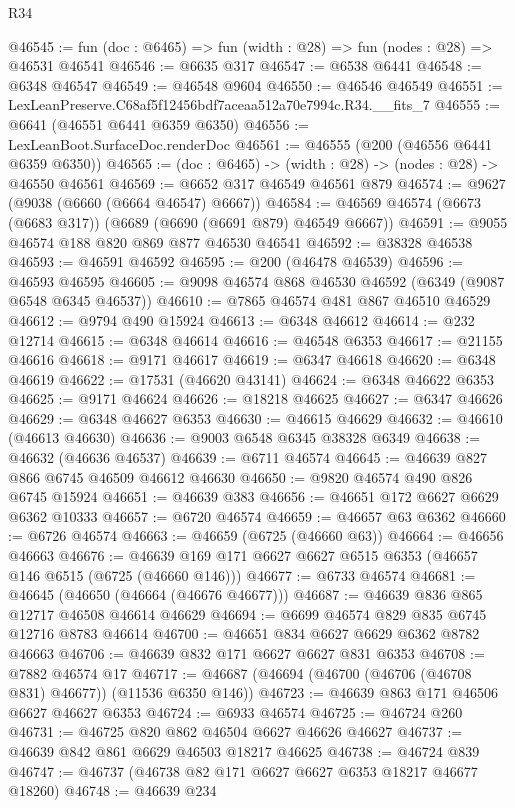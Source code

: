 \begin{lexlean}{R34}
\begin{coremodule}
@46545 := fun (doc : @6465) => fun (width : @28) => fun (nodes : @28) => @46531 @46541
@46546 := @6635 @317
@46547 := @6538 @6441
@46548 := @6348 @46547
@46549 := @46548 @9604
@46550 := @46546 @46549
@46551 := LexLeanPreserve.C68af5f12456bdf7aceaa512a70e7994c.R34.__fits_7
@46555 := @6641 (@46551 @6441 @6359 @6350)
@46556 := LexLeanBoot.SurfaceDoc.renderDoc
@46561 := @46555 (@200 (@46556 @6441 @6359 @6350))
@46565 := (doc : @6465) -> (width : @28) -> (nodes : @28) -> @46550 @46561
@46569 := @6652 @317 @46549 @46561 @879
@46574 := @9627 (@9038 (@6660 (@6664 @46547) @6667))
@46584 := @46569 @46574 (@6673 (@6683 @317)) (@6689 (@6690 (@6691 @879) @46549 @6667))
@46591 := @9055 @46574 @188 @820 @869 @877 @46530 @46541
@46592 := @38328 @46538
@46593 := @46591 @46592
@46595 := @200 (@46478 @46539)
@46596 := @46593 @46595
@46605 := @9098 @46574 @868 @46530 @46592 (@6349 (@9087 @6548 @6345 @46537))
@46610 := @7865 @46574 @481 @867 @46510 @46529
@46612 := @9794 @490 @15924
@46613 := @6348 @46612
@46614 := @232 @12714
@46615 := @6348 @46614
@46616 := @46548 @6353
@46617 := @21155 @46616
@46618 := @9171 @46617
@46619 := @6347 @46618
@46620 := @6348 @46619
@46622 := @17531 (@46620 @43141)
@46624 := @6348 @46622 @6353
@46625 := @9171 @46624
@46626 := @18218 @46625
@46627 := @6347 @46626
@46629 := @6348 @46627 @6353
@46630 := @46615 @46629
@46632 := @46610 (@46613 @46630)
@46636 := @9003 @6548 @6345 @38328 @6349
@46638 := @46632 (@46636 @46537)
@46639 := @6711 @46574
@46645 := @46639 @827 @866 @6745 @46509 @46612 @46630
@46650 := @9820 @46574 @490 @826 @6745 @15924
@46651 := @46639 @383
@46656 := @46651 @172 @6627 @6629 @6362 @10333
@46657 := @6720 @46574
@46659 := @46657 @63 @6362
@46660 := @6726 @46574
@46663 := @46659 (@6725 (@46660 @63))
@46664 := @46656 @46663
@46676 := @46639 @169 @171 @6627 @6627 @6515 @6353 (@46657 @146 @6515 (@6725 (@46660 @146)))
@46677 := @6733 @46574
@46681 := @46645 (@46650 (@46664 (@46676 @46677)))
@46687 := @46639 @836 @865 @12717 @46508 @46614 @46629
@46694 := @6699 @46574 @829 @835 @6745 @12716 @8783 @46614
@46700 := @46651 @834 @6627 @6629 @6362 @8782 @46663
@46706 := @46639 @832 @171 @6627 @6627 @831 @6353
@46708 := @7882 @46574 @17
@46717 := @46687 (@46694 (@46700 (@46706 (@46708 @831) @46677)) (@11536 @6350 @146))
@46723 := @46639 @863 @171 @46506 @6627 @46627 @6353
@46724 := @6933 @46574
@46725 := @46724 @260
@46731 := @46725 @820 @862 @46504 @6627 @46626 @46627
@46737 := @46639 @842 @861 @6629 @46503 @18217 @46625
@46738 := @46724 @839
@46747 := @46737 (@46738 @82 @171 @6627 @6627 @6353 @18217 @46677 @18260)
@46748 := @46639 @234

\end{coremodule}
\end{lexlean}
